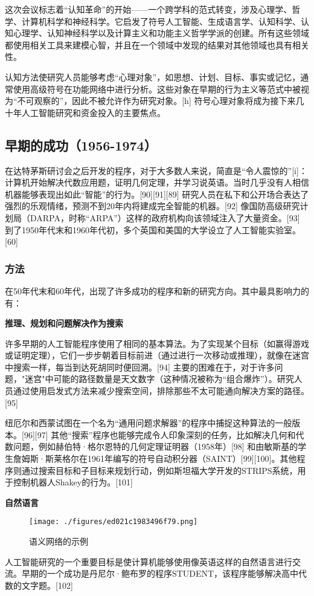 这次会议标志着“认知革命”的开始——一个跨学科的范式转变，涉及心理学、哲学、计算机科学和神经科学。它启发了符号人工智能、生成语言学、认知科学、认知心理学、认知神经科学以及计算主义和功能主义哲学学派的创建。所有这些领域都使用相关工具来建模心智，并且在一个领域中发现的结果对其他领域也具有相关性。  

认知方法使研究人员能够考虑“心理对象”，如思想、计划、目标、事实或记忆，通常使用高级符号在功能网络中进行分析。这些对象在早期的行为主义等范式中被视为“不可观察的”，因此不被允许作为研究对象。[h] 符号心理对象将成为接下来几十年人工智能研究和资金投入的主要焦点。
\subsection{早期的成功（1956-1974）}  
在达特茅斯研讨会之后开发的程序，对于大多数人来说，简直是“令人震惊的”[i]：计算机开始解决代数应用题，证明几何定理，并学习说英语。当时几乎没有人相信机器能够表现出如此“智能”的行为。[90][91][89] 研究人员在私下和公开场合表达了强烈的乐观情绪，预测不到20年内将建成完全智能的机器。[92] 像国防高级研究计划局（DARPA，时称“ARPA”）这样的政府机构向该领域注入了大量资金。[93] 到了1950年代末和1960年代初，多个英国和美国的大学设立了人工智能实验室。[60]  
\subsubsection{方法}  
在50年代末和60年代，出现了许多成功的程序和新的研究方向。其中最具影响力的有：

\textbf{推理、规划和问题解决作为搜索}  

许多早期的人工智能程序使用了相同的基本算法。为了实现某个目标（如赢得游戏或证明定理），它们一步步朝着目标前进（通过进行一次移动或推理），就像在迷宫中搜索一样，每当到达死胡同时便回溯。[94] 主要的困难在于，对于许多问题，"迷宫"中可能的路径数量是天文数字（这种情况被称为“组合爆炸”）。研究人员通过使用启发式方法来减少搜索空间，排除那些不太可能通向解决方案的路径。[95]

纽厄尔和西蒙试图在一个名为“通用问题求解器”的程序中捕捉这种算法的一般版本。[96][97] 其他“搜索”程序也能够完成令人印象深刻的任务，比如解决几何和代数问题，例如赫伯特·格尔恩特的几何定理证明器（1958年）[98] 和由敏斯基的学生詹姆斯·斯莱格尔在1961年编写的符号自动积分器（SAINT）[99][100]。其他程序则通过搜索目标和子目标来规划行动，例如斯坦福大学开发的STRIPS系统，用于控制机器人Shakey的行为。[101]

\textbf{自然语言}
\begin{figure}[ht]
\centering
\texttt{[image: ./figures/ed021c1983496f79.png]}
\caption{语义网络的示例} \label{fig_RGZN_8}
\end{figure}
人工智能研究的一个重要目标是使计算机能够使用像英语这样的自然语言进行交流。早期的一个成功是丹尼尔·鲍布罗的程序STUDENT，该程序能够解决高中代数的文字题。[102]


